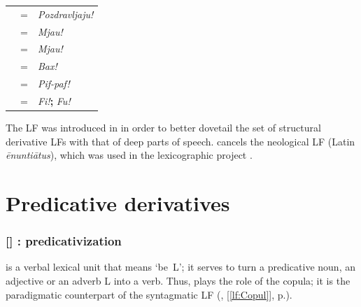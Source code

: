 \begin{longtable*}[l]{ l l >{\raggedright\arraybackslash}p{7cm} }
 & = & \textit{Pozdravljaju!} \\
 & = & \textit{Mjau!} \\
 & = & \textit{Mjau!} \\
 & = & \textit{Bax!} \\
 & = &  \textit{Pif-paf!} \\
 & = & \textit{Fi!}\textbf{;} \textit{Fu!} \\

\end{longtable*}

\begin{historicalremark}
The  LF was introduced in \textcite{MelcukPolguere2021} in order to better dovetail the set of structural derivative LFs with that of deep parts of speech.  cancels the neological LF  ({\smaller Latin} \textit{\={e}nunti\={a}tus}), which was used in the  lexicographic project \parencite{Polguere2000b}.
\end{historicalremark}

\section{Predicative derivatives}\label{sec:derivationPredicativisation}

\subsubsection*{{\small []}  : predicativization}\label{lf:Pred}

 is a verbal lexical unit that means `be~L'; it serves to turn a predicative noun, an adjective or an adverb L into a verb. Thus,  plays the role of the copula; it is the paradigmatic counterpart of the syntagmatic LF  (, [\ref{lf:Copul}], p.\thinspace\pageref{lf:Copul}).

